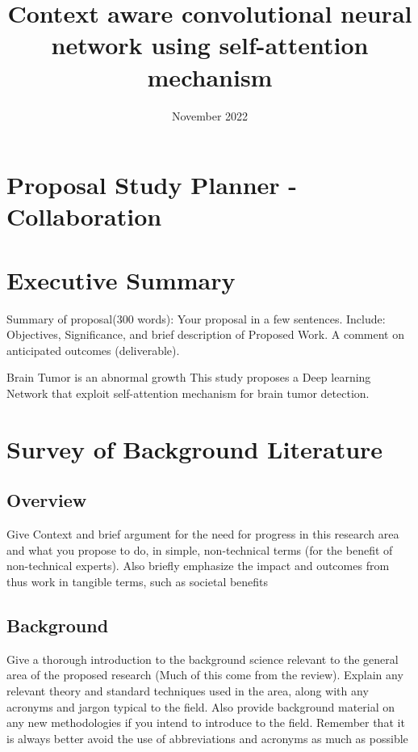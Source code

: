 \documentclass{article}
\title{Context aware convolutional neural network using self-attention mechanism }
\date{November 2022}
\begin{document}
\maketitle

\section*{Proposal Study Planner - Collaboration}

\section{Executive Summary}

Summary of proposal(300 words): Your proposal in a few sentences. Include: Objectives, Significance, and brief description of Proposed Work. A comment on anticipated outcomes (deliverable).

Brain Tumor is an abnormal growth
This study proposes a Deep learning Network that exploit self-attention mechanism for brain tumor detection. 



\section{Survey of Background Literature}

\subsection{Overview}

Give Context and brief argument for the need for progress in this research area and what you propose to do, in simple, non-technical terms (for the benefit of non-technical experts). Also briefly emphasize the impact and outcomes from thus work in tangible terms, such as societal benefits
\subsection{Background}

Give a thorough introduction to the background science relevant to the general area of the proposed research (Much of this come from the review). Explain any relevant theory and standard techniques used in the area, along with any acronyms and jargon typical to the field. Also provide background material on any new methodologies if you intend to introduce to the field. Remember that it is always better avoid the use of abbreviations and acronyms as much as possible
\end{document}

